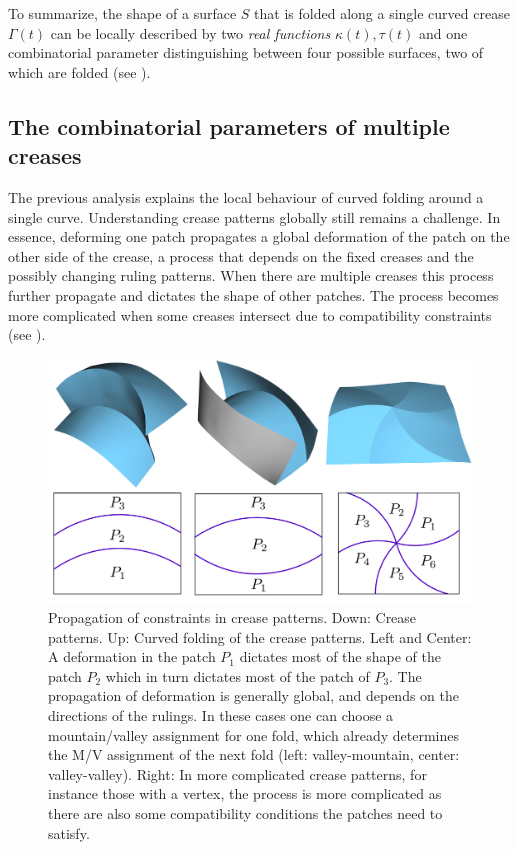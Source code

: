 To summarize, the shape of a surface $S$ that is folded along a single curved crease $\Gamma(t)$ can be locally described by two \textit{real functions} $\kappa(t),\tau(t)$  and one combinatorial parameter distinguishing between four possible surfaces, two of which are folded (see ).
 

\subsection{The combinatorial parameters of multiple creases}
The previous analysis explains the local behaviour of curved folding around a single curve. Understanding crease patterns globally still remains a challenge. In essence, deforming one patch propagates a global deformation of the patch on the other side of the crease, a process that depends on the fixed creases and the possibly changing ruling patterns. When there are multiple creases this process further propagate and dictates the shape of other patches. The process becomes more complicated when some creases intersect due to compatibility constraints (see ). 

\begin{figure} [h]
	\centering
	\includegraphics[width=\linewidth]{figures/multiple_crease_patterns}
	\caption{Propagation of constraints in crease patterns. Down: Crease patterns. Up: Curved folding of the crease patterns. Left and Center: A deformation in the patch $P_1$ dictates most of the shape of the patch $P_2$ which in turn dictates most of the patch of $P_3$. The propagation of deformation is generally global, and depends on the directions of the rulings. In these cases one can choose a mountain/valley assignment for one fold, which already determines the M/V assignment of the next fold (left: valley-mountain, center: valley-valley). Right: In more complicated crease patterns, for instance those with a vertex, the process is more complicated as there are also some compatibility conditions the patches need to satisfy. }
	\label{fig:multiple_crease_patterns}
\end{figure}

